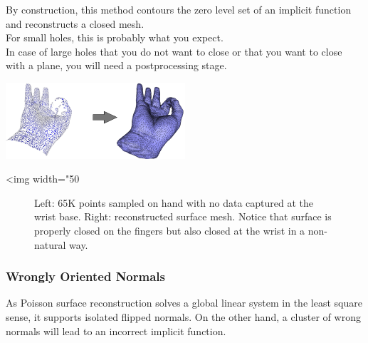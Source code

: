 By construction, this method contours the zero level set of an implicit function and reconstructs a closed mesh.\\
For small holes, this is probably what you expect. \\
In case of large holes that you do not want to close or that you want to close with a plane, you will need a postprocessing stage.

\begin{center}
    \label{Surface_reconstruction_points_3-fig-holes_bad}
    \begin{ccTexOnly}
      \includegraphics[width=0.5\textwidth]{Surface_reconstruction_points_3/holes_bad} %
    \end{ccTexOnly}
    \begin{ccHtmlOnly}
        <img width="50%
    \end{ccHtmlOnly}
    \begin{figure}[h]
        \caption{Left: 65K points sampled on hand with no data captured at the wrist base.
                 Right: reconstructed surface mesh. Notice that surface is properly closed on the fingers
                 but also closed at the wrist in a non-natural way.}
    \end{figure}
\end{center}


\subsubsection{Wrongly Oriented Normals}

As Poisson surface reconstruction solves a global linear system in the least square sense, it supports isolated flipped normals.
On the other hand, a cluster of wrong normals will lead to an incorrect implicit function.

